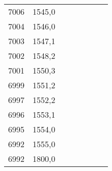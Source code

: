 \documentclass[11pt]{article}
\begin{document}
{{\begin{tabular}{|c|c|cccccc}
            \cline{1-2} 
            7006 & 1545,0 &  &  &  &  &  & \tabularnewline
            \cline{1-2} 
            7004 & 1546,0 &  &  &  &  &  & \tabularnewline
            \cline{1-2} 
            7003 & 1547,1 &  &  &  &  &  & \tabularnewline
            \cline{1-2} 
            7002 & 1548,2 &  &  &  &  &  & \tabularnewline
            \cline{1-2} 
            7001 & 1550,3 &  &  &  &  &  & \tabularnewline
            \cline{1-2} 
            6999 & 1551,2 &  &  &  &  &  & \tabularnewline
            \cline{1-2} 
            6997 & 1552,2 &  &  &  &  &  & \tabularnewline
            \cline{1-2} 
            6996 & 1553,1 &  &  &  &  &  & \tabularnewline
            \cline{1-2} 
            6995 & 1554,0 &  &  &  &  &  & \tabularnewline
            \cline{1-2} 
            6992 & 1555,0 &  &  &  &  &  & \tabularnewline
            \cline{1-2} 
            6992 & 1800,0 &  &  &  &  &  & \tabularnewline
            \cline{1-2} 
        \end{tabular}
    }
}
\vspace*{\fill}
\end{document}
